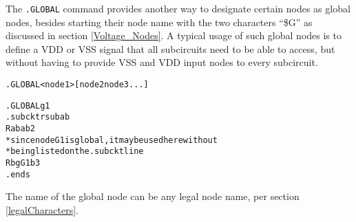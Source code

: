 


\label{GLOBAL_section}

The \texttt{.GLOBAL} command provides another way to designate certain 
nodes as global nodes, besides starting their node name with the two 
characters ``\$G'' as discussed in section \ref{Voltage_Nodes}.  A typical 
usage of such global nodes is to define a VDD or VSS signal that all
subcircuits need to be able to access, but without having to provide 
VSS and VDD input nodes to every subcircuit. 

\begin{Command}

\format
\begin{alltt}
.GLOBAL <node1> [ node2 node3 ... ]
\end{alltt}

\examples
\begin{alltt}
.GLOBAL g1
.subckt rsub  a  b
Rab  a  b  2
* since node G1 is global, it may be used here without
* being listed on the .subckt line
Rbg  G1  b  3  
.ends
\end{alltt}

\comments
The name of the global node can be any legal node name, per 
section \ref{legalCharacters}.

\end{Command}

